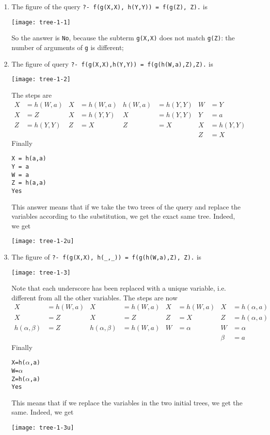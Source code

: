 \begin{enumerate}

  \item The figure of the query
    \verb|?- f(g(X,X), h(Y,Y)) = f(g(Z), Z).| is
  \begin{center}
    \texttt{[image: tree-1-1]}
  \end{center}
  So the answer is \texttt{No}, because the subterm \texttt{g(X,X)}
  does not match \texttt{g(Z)}: the number of arguments of \texttt{g}
  is different;

  \item The figure of query
  \verb|?- f(g(X,X),h(Y,Y)) = f(g(h(W,a),Z),Z).| is
  \begin{center}
    \texttt{[image: tree-1-2]}
  \end{center}
  The steps are
\begin{align*}
X &= h(W,a) & X &= h(W,a) & h(W,a) &= h(Y,Y) & W &= Y\\
X &= Z      & X &= h(Y,Y) & X      &= h(Y,Y) & Y &= a\\
Z &= h(Y,Y) & Z &= X      & Z      &= X      & X &= h(Y,Y)\\
  &         &   &         &        &         & Z &= X
\end{align*}
  \noindent Finally
\begin{verbatim}
X = h(a,a)
Y = a
W = a
Z = h(a,a)
Yes
\end{verbatim}
  \noindent This answer means that if we take the two trees of the
  query and replace the variables according to the substitution, we
  get the exact same tree. Indeed, we get
  \begin{center}
    \texttt{[image: tree-1-2u]}
  \end{center}


  \item The figure of 
  \verb|?- f(g(X,X), h(_,_)) = f(g(h(W,a),Z), Z).| is
  \begin{center}
    \texttt{[image: tree-1-3]}
   \end{center}
  \noindent Note that each underscore has been replaced with a unique
  variable, i.e. different from all the other variables. The steps are
  now
  \begin{align*}
                   X &= h(W,a) &                X &= h(W,a) & X &= h(W,a) & X &= h(\alpha,a)\\
                   X &= Z      &                X &=Z       & Z &= X      & Z &= h(\alpha,a)\\
    h(\alpha, \beta) &= Z      & h(\alpha, \beta) &= h(W,a) & W &= \alpha & W &= \alpha\\
                     &         &                  &         &   &         & \beta &= a
  \end{align*}
  \noindent Finally
\begin{alltt}
X = h(\(\alpha\),a)
W = \(\alpha\)
Z = h(\(\alpha\),a) 
Yes
\end{alltt}
  \noindent This means that if we replace the variables in the two
  initial trees, we get the same. Indeed, we get
  \begin{center}
    \texttt{[image: tree-1-3u]}
  \end{center}


\end{enumerate}
